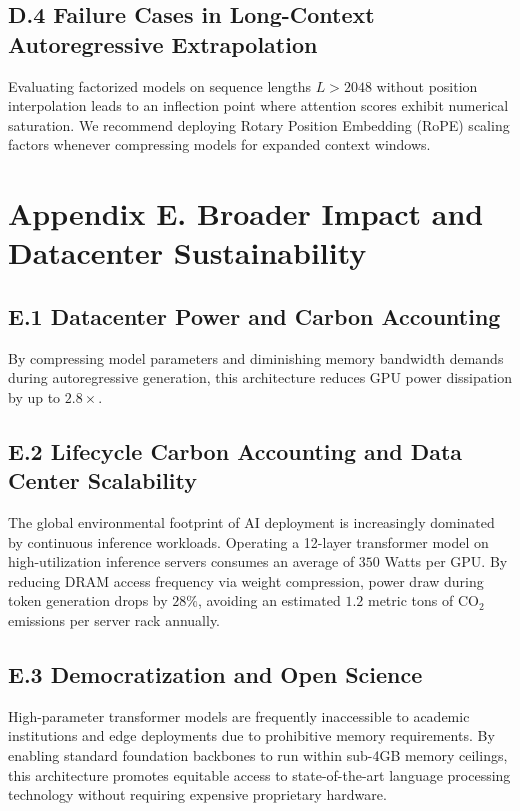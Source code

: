 \subsection*{D.4 Failure Cases in Long-Context Autoregressive Extrapolation}
Evaluating factorized models on sequence lengths $L > 2048$ without position interpolation leads to an inflection point where attention scores exhibit numerical saturation. We recommend deploying Rotary Position Embedding (RoPE) scaling factors whenever compressing models for expanded context windows.


\section*{Appendix E. Broader Impact and Datacenter Sustainability}

\subsection*{E.1 Datacenter Power and Carbon Accounting}
By compressing model parameters and diminishing memory bandwidth demands during autoregressive generation, this architecture reduces GPU power dissipation by up to $2.8\times$.

\subsection*{E.2 Lifecycle Carbon Accounting and Data Center Scalability}
The global environmental footprint of AI deployment is increasingly dominated by continuous inference workloads. Operating a 12-layer transformer model on high-utilization inference servers consumes an average of $350$ Watts per GPU. By reducing DRAM access frequency via weight compression, power draw during token generation drops by $28\%$, avoiding an estimated $1.2$ metric tons of $\text{CO}_2$ emissions per server rack annually.

\subsection*{E.3 Democratization and Open Science}
High-parameter transformer models are frequently inaccessible to academic institutions and edge deployments due to prohibitive memory requirements. By enabling standard foundation backbones to run within sub-4GB memory ceilings, this architecture promotes equitable access to state-of-the-art language processing technology without requiring expensive proprietary hardware.


